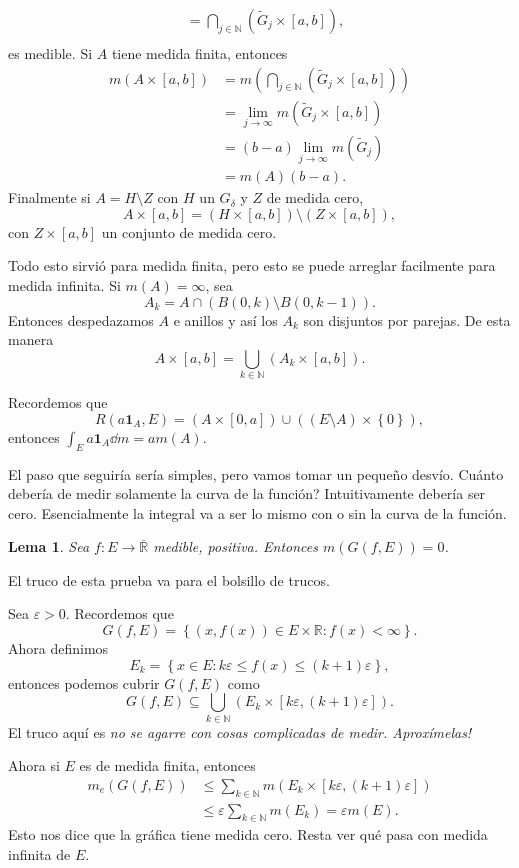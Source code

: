 \documentclass[12pt]{article}
\theoremstyle{plain}
\newtheorem{Lem}[Th]{Lema}             %
\theoremstyle{definition}
\theoremstyle{remark}
\numberwithin{equation}{section}
\newcommand{\bN}{\mathbb{N}}        %
\newcommand{\bR}{\mathbb{R}}        %
\newcommand{\ind}{\mathbf{1}}       %
\renewcommand{\leq}{\leqslant}      %
\renewcommand{\:}{\colon}           %
\newcommand{\conj}[1]{\left\lbrace#1\right\rbrace}
\newcommand{\bonj}[1]{\left\lbrack#1\right\rbrack}
\begin{document}
\begin{multicols}{2}
\begin{ptcbp}
\begin{enumerate}
\begin{align*}
        &= \bigcap_{j\in\bN}\left(\tilde{G}_j\times\bonj{a,b}\right),\\
      \end{align*}
      es medible. Si $A$ tiene medida finita, entonces
       \begin{align*}
        m(A\times\bonj{a,b}) &=m\left(\bigcap_{j\in\bN}\left(\tilde{G}_j\times\bonj{a,b}\right)\right)\\
        &=\lim_{j\to\infty}m\left(\tilde{G}_j\times\bonj{a,b}\right)\\
        &=(b-a)\lim_{j\to\infty}m\left(\tilde{G}_j\right)\\
        &=m(A)(b-a).
      \end{align*}
      Finalmente si $A=H\setminus Z$ con $H$ un $G_\delta$ y $Z$ de medida cero,
      $$A\times\bonj{a,b}=(H\times\bonj{a,b})\setminus(Z\times\bonj{a,b}),$$
      con $Z\times\bonj{a,b}$ un conjunto de medida cero.\par
      Todo esto sirvió para medida finita, pero esto se puede arreglar facilmente para medida infinita. Si $m(A)=\infty$, sea
      $$A_k=A\cap (B(0,k)\setminus B(0,k-1)).$$
      Entonces despedazamos $A$ e anillos y así los $A_k$ son disjuntos por parejas. De esta manera
      $$A\times\bonj{a,b}=\bigcup_{k\in\bN}\left(A_k\times\bonj{a,b}\right).$$
\end{enumerate}
Recordemos que
$$R(a\ind_A,E)=(A\times\bonj{0,a})\cup((E\setminus A)\times\conj{0}),$$
entonces $\int_{E}a\ind_A\dd m=am(A)$.
\end{ptcbp}

El paso que seguiría sería simples, pero vamos tomar un pequeño desvío. Cuánto debería de medir solamente la curva de la función? Intuitivamente debería ser cero. Esencialmente la integral va a ser lo mismo con o sin la curva de la función.

\begin{Lem}
  Sea $f\: E\to\overline{\bR}$ medible, positiva. Entonces $m(G(f,E))=0$.
\end{Lem}

El truco de esta prueba va para el bolsillo de trucos.

\begin{ptcbp}
Sea $\varepsilon>0$. Recordemos que
 $$G(f,E)=\conj{(x,f(x))\in E\times\bR\: f(x)<\infty}.$$
 Ahora definimos
 $$E_k=\conj{x\in E\: k\varepsilon\leq f(x)\leq(k+1)\varepsilon},$$
 entonces podemos cubrir $G(f,E)$ como
 $$G(f,E)\subseteq\bigcup_{k\in\bN}\left(E_k\times\bonj{k\varepsilon,(k+1)\varepsilon}\right).$$
 El truco aquí es \emph{no se agarre con cosas complicadas de medir. Aproxímelas!}\par
 Ahora si $E$ es de medida finita, entonces
 \begin{align*}
   m_e(G(f,E)) &\leq\sum_{k\in\bN}m(E_k\times\bonj{k\varepsilon,(k+1)\varepsilon})\\
   &\leq \varepsilon\sum_{k\in\bN}m(E_k)=\varepsilon m(E).
 \end{align*}
 Esto nos dice que la gráfica tiene medida cero. Resta ver qué pasa con medida infinita de $E$.
\end{ptcbp}


\end{multicols}
\end{document}
